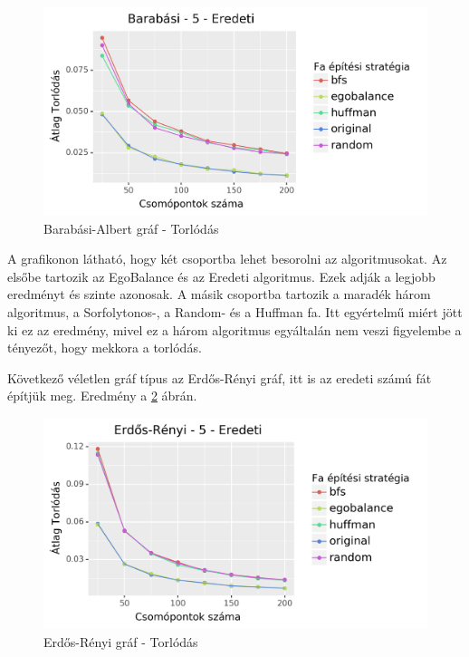 \documentclass[12pt]{report}
\begin{document}
\begin{figure}[H]
	\begin{center}
		\includegraphics[width=0.9\linewidth]{pictures/barabasi_con_e.png}
		\caption{Barabási-Albert gráf - Torlódás}
		\label{barabasi-con}
	\end{center}
\end{figure}

A grafikonon látható, hogy két csoportba lehet besorolni az algoritmusokat. 
Az elsőbe tartozik az EgoBalance és az Eredeti algoritmus.
Ezek adják a legjobb eredményt és szinte azonosak.
A másik csoportba tartozik a maradék három algoritmus, a Sorfolytonos-, a Random- és a Huffman fa.
Itt egyértelmű miért jött ki ez az eredmény, mivel ez a három algoritmus egyáltalán nem veszi figyelembe a tényezőt, hogy mekkora a torlódás.

Következő véletlen gráf típus az Erdős-Rényi gráf, itt is az eredeti számú fát építjük meg. 
Eredmény a \ref{erdos-con} ábrán.

\begin{figure}[H]
	\begin{center}
		\includegraphics[width=0.9\linewidth]{pictures/erdos_con_e.png}
		\caption{Erdős-Rényi gráf - Torlódás}
		\label{erdos-con}
	\end{center}
\end{figure}
\end{document}
